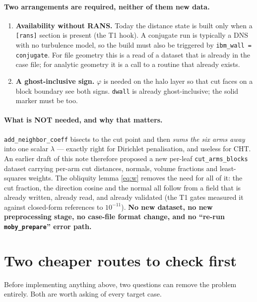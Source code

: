 \documentclass[11pt,a4paper]{article}
\newcommand{\code}[1]{\texttt{#1}}
\begin{document}
\paragraph{Two arrangements are required, neither of them new data.}
\begin{enumerate}
\item \textbf{Availability without RANS.} Today the distance state is built only
      when a \code{[rans]} section is present (the T1 hook). A conjugate run is
      typically a DNS with no turbulence model, so the build must also be
      triggered by \code{ibm\_wall = conjugate}. For file geometry this is a
      read of a dataset that is already in the case file; for analytic geometry
      it is a call to a routine that already exists.
\item \textbf{A ghost-inclusive sign.} $\varphi$ is needed on the halo layer so
      that cut faces on a block boundary see both signs. \code{dwall} is already
      ghost-inclusive; the solid marker must be too.
\end{enumerate}

\paragraph{What is NOT needed, and why that matters.}
\code{add\_neighbor\_coeff} bisects to the cut point and then \emph{sums the six
arms away} into one scalar $\lambda$ --- exactly right for Dirichlet
penalisation, and useless for CHT. An earlier draft of this note therefore
proposed a new per-leaf \code{cut\_arms\_blocks} dataset carrying per-arm cut
distances, normals, volume fractions and least-squares weights. The obliquity
lemma \eqref{eq:w} removes the need for all of it: the cut fraction, the
direction cosine and the normal all follow from a field that is already written,
already read, and already validated (the T1 gates measured it against closed-form
references to $10^{-11}$). \textbf{No new dataset, no new preprocessing stage, no
case-file format change, and no ``re-run \code{moby\_prepare}'' error path.}

\section{Two cheaper routes to check first}
\label{sec:cheaper}

Before implementing anything above, two questions can remove the problem
entirely. Both are worth asking of every target case.
\end{document}
